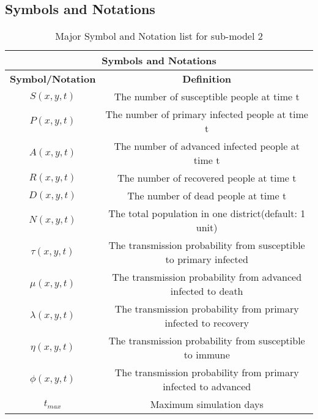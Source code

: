 \subsection{Symbols and Notations}
\begin{table}[htbp]
\caption{Major Symbol and Notation list for sub-model 2}
\center
\begin{tabular}{|cc|ccccc|}
\hline
                                      \multicolumn{ 7}{|c|}{{\bf Symbols and Notations}} \\
\hline
\multicolumn{ 2}{|c|}{{\bf Symbol/Notation}} &                  \multicolumn{ 5}{|c|}{{\bf Definition}} \\
\hline
\multicolumn{ 2}{|c|}{$S(x,y,t)$} & \multicolumn{ 5}{|c|}{The number of susceptible people at time t} \\
\hline
\multicolumn{ 2}{|c|}{$P(x,y,t)$} & \multicolumn{ 5}{|c|}{The number of primary infected people at time t} \\
\hline
\multicolumn{ 2}{|c|}{$A(x,y,t)$} & \multicolumn{ 5}{|c|}{The number of advanced infected people at time t} \\
\hline
\multicolumn{ 2}{|c|}{$R(x,y,t)$} & \multicolumn{ 5}{|c|}{The number of recovered people at time t} \\
\hline
\multicolumn{ 2}{|c}{$D(x,y,t)$} &      \multicolumn{ 5}{|c|}{The number of dead people at time t} \\
\hline
\multicolumn{ 2}{|c|}{$N(x,y,t)$} & \multicolumn{ 5}{|c|}{The total population in one district(default: 1 unit)} \\
\hline
\multicolumn{ 2}{|c|}{$\tau(x,y,t)$} & \multicolumn{ 5}{|c|}{The transmission probability from susceptible to primary infected} \\
\hline
\multicolumn{ 2}{|c|}{$\mu(x,y,t)$} & \multicolumn{ 5}{|c|}{The transmission probability from advanced infected to death} \\
\hline
\multicolumn{ 2}{|c|}{$\lambda(x,y,t)$} & \multicolumn{ 5}{|c|}{The transmission probability from primary infected to recovery} \\
\hline
\multicolumn{ 2}{|c|}{$\eta(x,y,t)$} & \multicolumn{ 5}{|c|}{The transmission probability from susceptible to immune} \\
\hline
\multicolumn{ 2}{|c|}{$\phi(x,y,t)$} & \multicolumn{ 5}{|c|}{The transmission probability from primary infected to advanced} \\
\hline
\multicolumn{ 2}{|c|}{$t_{max}$} &                 \multicolumn{ 5}{|c|}{Maximum simulation days} \\
\hline
\end{tabular}  
\end{table}
